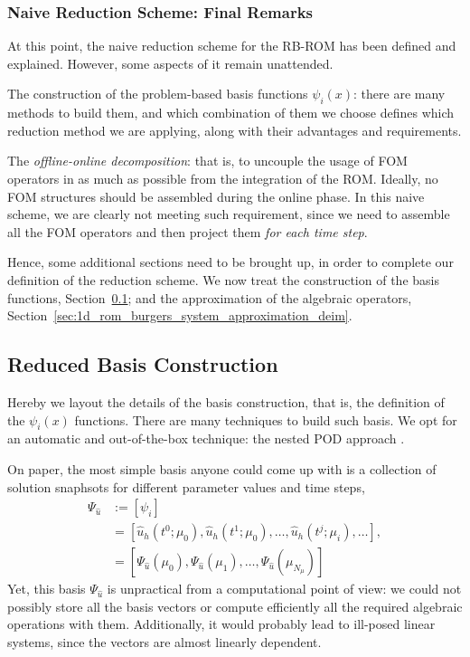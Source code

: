 \documentclass[../../thesis.tex]{subfiles}
\begin{document}
\subsubsection{Naive Reduction Scheme: Final Remarks}
At this point, the naive reduction scheme for the RB-ROM has been defined and explained.
However, some aspects of it remain unattended.

The construction of the problem-based basis functions $\psi_i(x)$:
there are many methods to build them, and which combination of them we choose 
defines which reduction method we are applying, along with their advantages and requirements.

The \emph{offline-online decomposition}: 
that is, to uncouple the usage of FOM operators in as much as possible from the integration of the ROM. 
Ideally, no FOM structures should be assembled during the online phase.
In this naive scheme, we are clearly not meeting such requirement, 
since we need to assemble all the FOM operators and then project them \emph{for each time step}.

Hence, some additional sections need to be brought up, 
in order to complete our definition of the reduction scheme.
We now treat the construction of the basis functions, Section~\ref{sec:1d_rom_burgers_basis_construction}; and the approximation of the algebraic operators, Section~\ref{sec:1d_rom_burgers_system_approximation_deim}.

\subsection{Reduced Basis Construction}
\label{sec:1d_rom_burgers_basis_construction}
Hereby we layout the details of the basis construction, that is, the definition of the $\psi_i(x)$ functions.
There are many techniques to build such basis.
We opt for an automatic and out-of-the-box technique: the nested POD approach
\cite{Santo_Manzoni_2019}. 

On paper, the most simple basis anyone could come up with is 
a collection of solution snaphsots for different parameter values and time steps, 
\begin{align}
    \Psi_{\hat{u}} &:= [\psi_i] \nonumber \\
    &= [\hat{u}_h(t^0; \mu_0), \hat{u}_h(t^1; \mu_0), 
    \ldots, \hat{u}_h(t^j; \mu_i), \ldots], \nonumber \\
    &= [\Psi_{\hat{u}}(\mu_0), \Psi_{\hat{u}}(\mu_1), \ldots, \Psi_{\hat{u}}(\mu_{N_{\mu}})]
\end{align}
Yet, this basis $\Psi_{\hat{u}}$ is unpractical from a computational point of view: we could not possibly store all the basis vectors or compute efficiently all the required algebraic operations with them.
Additionally, it would probably lead to ill-posed linear systems, since the vectors are almost linearly dependent. 
\end{document}
